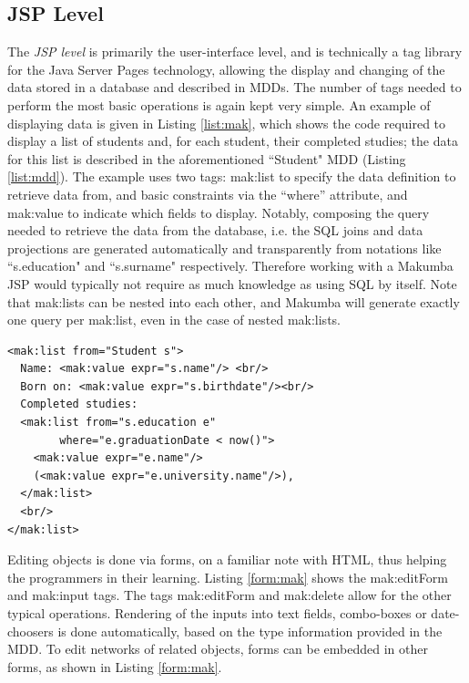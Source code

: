 \documentclass{llncs}
\begin{document}
\subsection{JSP Level}
The \textit{JSP level} is primarily the user-interface level, and is technically a tag library for the Java Server Pages technology, allowing the display and changing of the data stored in a database and described in MDDs. The number of tags needed to perform the most basic operations is again kept very simple. An example of displaying data is given in Listing \ref{list:mak}, which shows the code required to display a list of students and, for each student, their completed studies; the data for this list is described in the aforementioned ``Student" MDD (Listing \ref{list:mdd}). The example uses two tags: mak:list to specify the data definition to retrieve data from, and basic constraints via the ``where'' attribute, and mak:value to indicate which fields to display. Notably, composing the query needed to retrieve the data from the database, i.e. the SQL joins and data projections are generated automatically and transparently from notations like ``s.education" and ``s.surname" respectively. Therefore working with a Makumba JSP would typically not require as much knowledge as using SQL by itself. Note that mak:lists can be nested into each other, and Makumba will generate exactly one query per mak:list, even in the case of nested mak:lists.

\lstset{basicstyle=\small, captionpos=b, caption=Example of viewing data with the Makumba JSP tag library, label=list:mak, frame=shadowbox}
\begin{lstlisting}
<mak:list from="Student s">
  Name: <mak:value expr="s.name"/> <br/>
  Born on: <mak:value expr="s.birthdate"/><br/>
  Completed studies:
  <mak:list from="s.education e"
  	    where="e.graduationDate < now()">
    <mak:value expr="e.name"/>
    (<mak:value expr="e.university.name"/>),
  </mak:list>
  <br/>
</mak:list>
\end{lstlisting}


Editing objects is done via forms, on a familiar note with HTML, thus helping the programmers in their learning.  Listing  \ref{form:mak} shows the mak:editForm and mak:input tags. The tags mak:editForm and mak:delete allow for the other typical operations. Rendering of the inputs into text fields, combo-boxes or date-choosers is done automatically, based on the type information provided in the MDD. To edit networks of related objects, forms can be embedded in other forms, as shown in Listing \ref{form:mak}.
\end{document}
